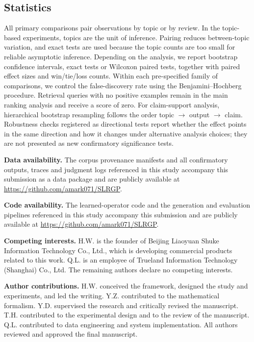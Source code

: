 \documentclass[11pt,a4paper]{article}
\begin{document}
\subsection*{Statistics}

All primary comparisons pair observations by topic or by review. In the topic-based experiments, topics are the unit of inference. Pairing reduces between-topic variation, and exact tests are used because the topic counts are too small for reliable asymptotic inference. Depending on the analysis, we report bootstrap confidence intervals, exact tests or Wilcoxon paired tests, together with paired effect sizes and win/tie/loss counts. Within each pre-specified family of comparisons, we control the false-discovery rate using the Benjamini--Hochberg procedure\cite{benjamini1995}. Retrieval queries with no positive examples remain in the main ranking analysis and receive a score of zero. For claim-support analysis, hierarchical bootstrap resampling follows the order topic $\rightarrow$ output $\rightarrow$ claim. Robustness checks registered as directional tests report whether the effect points in the same direction and how it changes under alternative analysis choices; they are not presented as new confirmatory significance tests.

\FloatBarrier

\noindent\textbf{Data availability.} The corpus provenance manifests and all confirmatory outputs, traces and judgment logs referenced in this study accompany this submission as a data package and are publicly available at \url{https://github.com/amark071/SLRGP}.

\noindent\textbf{Code availability.} The learned-operator code and the generation and evaluation pipelines referenced in this study accompany this submission and are publicly available at \url{https://github.com/amark071/SLRGP}.

\noindent\textbf{Competing interests.} H.W. is the founder of Beijing Liaoyuan Shuke Information Technology Co., Ltd., which is developing commercial products related to this work. Q.L. is an employee of Trueland Information Technology (Shanghai) Co., Ltd. The remaining authors declare no competing interests.

\noindent\textbf{Author contributions.} H.W. conceived the framework, designed the study and experiments, and led the writing. Y.Z. contributed to the mathematical formalism. Y.D. supervised the research and critically revised the manuscript. T.H. contributed to the experimental design and to the review of the manuscript. Q.L. contributed to data engineering and system implementation. All authors reviewed and approved the final manuscript.


\end{document}
